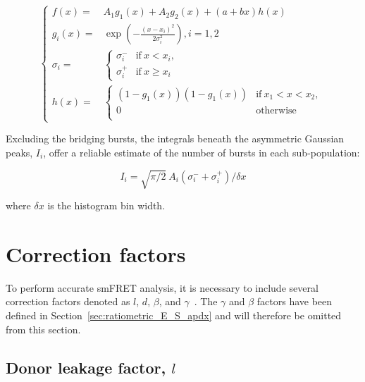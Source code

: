 \begin{equation}
\label{eqn:two_bridged_peaks_model}
\begin{cases}
f(x) = & A_1 g_1(x) + A_2 g_2(x) + (a + bx) h(x) \\

g_i(x) = & \exp \left(- \frac{(x - x_i)^2}{2 \sigma_i^2} \right), i = 1, 2 \\

\sigma_i = &
\begin{cases}
\sigma_i^- & \text{if}~x < x_i,\\
\sigma_i^+ & \text{if}~x \geq x_i
\end{cases} \\

h(x) = &
\begin{cases}
\left(1-g_1(x) \right) \left(1-g_1(x) \right) & \text{if}~x_1 < x < x_2,\\
0 & \text{otherwise} \\
\end{cases}
\end{cases}
\end{equation}

Excluding the bridging bursts, the integrals beneath the asymmetric Gaussian peaks, $I_i$, offer a reliable estimate of the number of bursts in each sub-population:

\begin{equation}
\label{eqn:AG_peak_integral}
I_i = \sqrt{\pi/2}~A_i \left(\sigma_i^- + \sigma_i^+ \right)/\delta x
\end{equation}

\noindent
where $\delta x$ is the histogram bin width.


\section{Correction factors}
\label{sec:correction_factors}

To perform accurate \ac{smFRET} analysis, it is necessary to include 
several correction factors denoted as $l$, $d$, $\beta$, and $\gamma$~\cite{lee_BPJ_2005}.
The $\gamma$ and $\beta$ factors have been defined in Section~\ref{sec:ratiometric_E_S_apdx} and will therefore be omitted from this section.

\subsection{Donor leakage factor, $l$}
\label{sec:lk_apdx}

